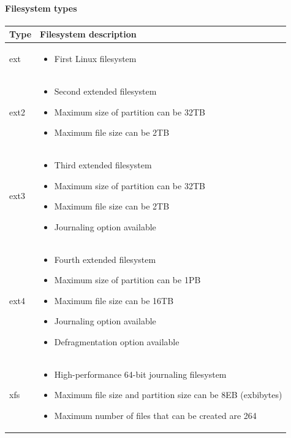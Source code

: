 \begin{flushleft}
\paragraph{Filesystem types}
\bigskip
\begin{tabulary}{1.0\textwidth}{|p{5em}|p{23em}|}
	\toprule
	\textbf{Type} & \textbf{Filesystem description}\\
	\midrule
	ext & 
	\begin{itemize}
		\item First Linux filesystem
	\end{itemize}
	\\
	\hline
	ext2 & 
	\begin{itemize}
		\item Second extended filesystem
		\item Maximum size of partition can be 32TB
		\item Maximum file size can be 2TB
	\end{itemize}
	\\
	\hline
	ext3 & 
	\begin{itemize}
		\item Third extended filesystem
		\item Maximum size of partition can be 32TB
		\item Maximum file size can be 2TB
		\item Journaling option available
	\end{itemize}
	\\
	\hline
	ext4 & 
	\begin{itemize}
		\item Fourth extended filesystem
		\item Maximum size of partition can be 1PB
		\item Maximum file size can be 16TB
		\item Journaling option available
		\item Defragmentation option available
	\end{itemize}
	\\
	\hline
	xfs &  
	\begin{itemize}
		\item High-performance 64-bit journaling filesystem
		\item Maximum file size and partition size can be 8EB (exbibytes)
		\item Maximum number of files that can be created are 264
	\end{itemize}
	 \\
	\bottomrule
\end{tabulary}

\end{flushleft}
